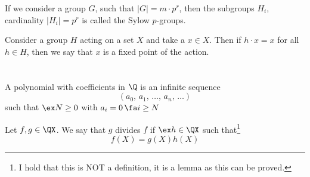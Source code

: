 \documentclass{article}
\begin{document}
\begin{ndefi}
  If we consider a group $G$, such that $|G| = m \cdot p^r$, then the subgroups $H_i$, cardinality $|H_i| = p^r$ is called the Sylow $p$-groups.
\end{ndefi}

\begin{ndefi}
  Consider a group $H$ acting on a set $X$ and take a $x \in X$. Then if $h \cdot x = x$ for all $h \in H$, then we say that $x$ is a fixed point of the action.
\end{ndefi}

\subsection[Proof of Sylow I]{}

\subsection[Proof of Sylow II]{}

\subsection[Proof of Sylow III]{}

\subsection[Classifying groups through Sylow]{}

\section[Polynomials]{}

\begin{ndefi}[Polynomial]
  A polynomial with coefficients in $\Q$ is an infinite sequence
  $$ (a_0,\,a_1,\,\dots,\,a_n,\,\dots) $$
  such that $\ex N \ge 0$ with $a_i =0\,\fa i \ge N$
\end{ndefi}

\begin{ndefi}[Division]
  Let $f, g \in \QX$. We say that $g$ divides $f$ if $\ex h \in \QX$ such that\footnote{I hold that this is NOT a definition, it is a lemma as this can be proved.}
  $$ f(X) = g(X)h(X) $$
\end{ndefi}
\end{document}

